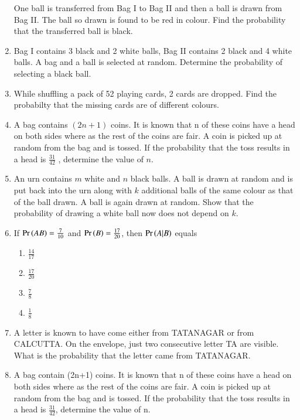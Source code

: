 \begin{enumerate}[label=\thesubsection.\arabic*,ref=\thesubsection.\theenumi]
One ball is transferred from Bag I to Bag II and then a ball is drawn from Bag II.
The ball so drawn is found to be red in colour. Find the probability that the
transferred ball is black. 
\\
\solution
		
\item Bag I contains 3 black and 2 white balls, Bag II contains 2 black and 4 white
balls. A bag and a ball is selected at random. Determine the probability of selecting
a black ball.\\
\solution

\item While shuffling a pack of 52 playing cards, 2 cards are dropped. Find the probabilty that the missing cards are of different colours.\\
\solution

\item A bag contains $(2n + 1)$ coins. It is known that n of these coins have a head on
both sides where as the rest of the coins are fair. A coin is picked up at random
from the bag and is tossed. If the probability that the toss results in a head is $\frac{31}{42}$
, determine the value of $n$.\\
\solution
%
\item An urn contains $m$ white and $n$ black balls. A ball is drawn at random and is put
back into the urn along with $k$ additional balls of the same colour as that of the
ball drawn. A ball is again drawn at random. Show that the probability of
drawing a white ball now does not depend on $k$.\\
\solution
%
\item If $\Pr\left(AB\right)=\frac{7}{10}$ and $\Pr\left(B\right)=\frac{17}{20}$, then $\Pr\left(A|B\right)$ equals
\begin{enumerate}
\item $\frac{14}{17}$
\item $\frac{17}{20}$
\item $\frac{7}{8}$
\item $\frac{1}{8}$
\end{enumerate}
%
\item 
A letter is known to have come either from TATANAGAR or from CALCUTTA. On the envelope, just two consecutive letter TA are visible. What is the probability that the letter came from TATANAGAR.\\
\solution
%
\item A bag contain (2n+1) coins. It is known that n of these coins have a head on both sides where as the rest of the coins are fair. A coin is picked up at random from the bag and is tossed. If the probability that the toss results in a head is $\frac{31}{42}$, determine the value of n.

\end{enumerate}
